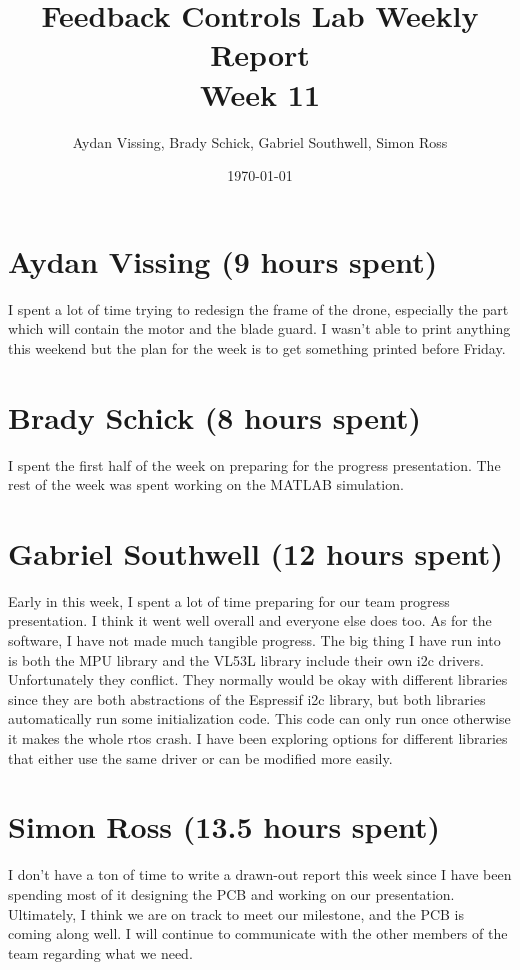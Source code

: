 \documentclass[12pt, titlepage]{article}
\title{Feedback Controls Lab Weekly Report \\ \normalsize{Week 11}}
\author{Aydan Vissing, Brady Schick, Gabriel Southwell, Simon Ross}
\date{\today}
\begin{document}
\maketitle

\section*{Aydan Vissing (9 hours spent)}

I spent a lot of time trying to redesign the frame of the drone, especially the part which will contain the motor and the blade guard. I wasn't able to print anything this weekend but the plan for the week is to get something printed before Friday. 

\section*{Brady Schick (8 hours spent)}

I spent the first half of the week on preparing for the progress presentation. The rest of the week was spent working on the MATLAB simulation.

\section*{Gabriel Southwell (12 hours spent)}

Early in this week, I spent a lot of time preparing for our team progress presentation. I think it went well overall and everyone else does too. 
As for the software, I have not made much tangible progress. The big thing I have run into is both the MPU library and the VL53L library include their own i2c drivers. Unfortunately they conflict. They normally would be okay with different libraries since they are both abstractions of the Espressif i2c library, but both libraries automatically run some initialization code. This code can only run once otherwise it makes the whole rtos crash. I have been exploring options for different libraries that either use the same driver or can be modified more easily. 

\section*{Simon Ross (13.5 hours spent)}

I don't have a ton of time to write a drawn-out report this week since I have been spending most of it designing the PCB and working on our presentation. Ultimately, I think we are on track to meet our milestone, and the PCB is coming along well. I will continue to communicate with the other members of the team regarding what we need.
\end{document}
